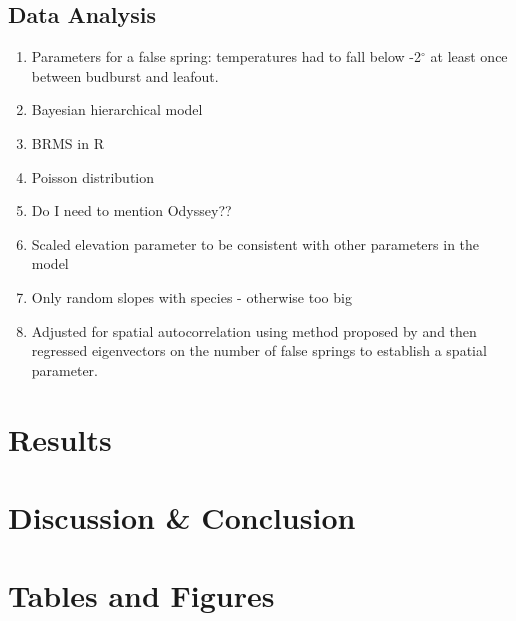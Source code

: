 \documentclass{article}\usepackage[]{graphicx}\usepackage[]{color}
\begin{document}
\subsection*{Data Analysis}
\begin{enumerate}
\item Parameters for a false spring: temperatures had to fall below -2$^{\circ}$ at least once between budburst and leafout.
\item Bayesian hierarchical model
\item BRMS in R 
\item Poisson distribution
\item Do I need to mention Odyssey??
\item Scaled elevation parameter to be consistent with other parameters in the model
\item Only random slopes with species - otherwise too big
\item Adjusted for spatial autocorrelation using method proposed by \citep{Baumen2017} and then regressed eigenvectors on the number of false springs to establish a spatial parameter. %
\end{enumerate}



\section*{Results}


\section*{Discussion \& Conclusion}




\section*{Tables and Figures}
\end{document}
